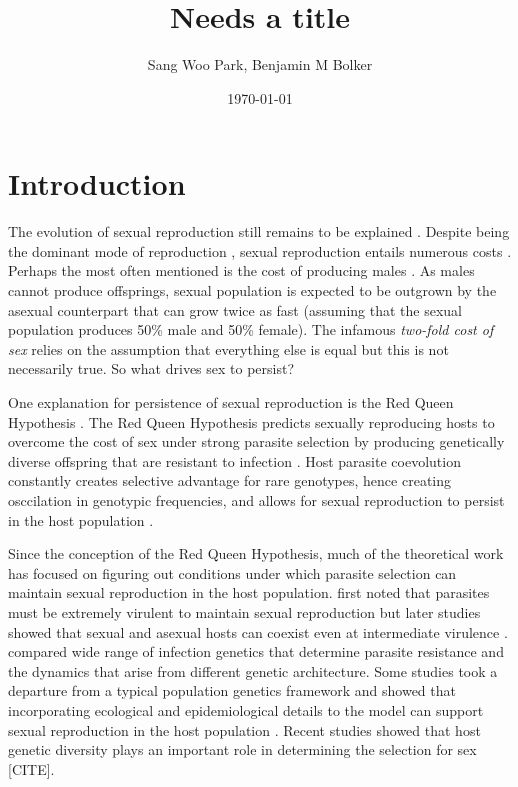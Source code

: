 \documentclass{article}\usepackage[]{graphicx}\usepackage[]{color}
\title{Needs a title}
\author{Sang Woo Park, Benjamin M Bolker}
\date{\today}
\begin{document}
\maketitle

\section{Introduction}

The evolution of sexual reproduction still remains to be explained \citep{otto2009evolutionary}.
Despite being the dominant mode of reproduction \citep{vrijenhoek1998animal}, sexual reproduction entails numerous costs \citep{lehtonen2012many}.
Perhaps the most often mentioned is the cost of producing males \citep{smith1978evolution}.
As males cannot produce offsprings, sexual population is expected to be outgrown by the asexual counterpart that can grow twice as fast (assuming that the sexual population produces 50\% male and 50\% female).
The infamous \emph{two-fold cost of sex} \citep{smith1978evolution} relies on the assumption that everything else is equal but this is not necessarily true.
So what drives sex to persist?

One explanation for persistence of sexual reproduction is the Red Queen Hypothesis \citep{bell1982masterpiece}.
The Red Queen Hypothesis predicts sexually reproducing hosts to overcome the cost of sex under strong parasite selection by producing genetically diverse offspring that are resistant to infection \citep{jbs1949disease, jaenike1978hypothesis, hamilton1980sex}.
Host parasite coevolution constantly creates selective advantage for rare genotypes, hence creating osccilation in genotypic frequencies, and allows for sexual reproduction to persist in the host population \citep{clarke1976ecological, hamilton1980sex}.

Since the conception of the Red Queen Hypothesis, much of the theoretical work has focused on figuring out conditions under which parasite selection can maintain sexual reproduction in the host population.
\cite{may1983epidemiology} first noted that parasites must be extremely virulent to maintain sexual reproduction but later studies showed that sexual and asexual hosts can coexist even at intermediate virulence \citep{howard1994parasitism}.
\cite{agrawal2002infection} compared wide range of infection genetics that determine parasite resistance and the dynamics that arise from different genetic architecture.
Some studies took a departure from a typical population genetics framework and showed that incorporating ecological and epidemiological details to the model can support sexual reproduction in the host population \citep{galvani2001antigenic, galvani2003maintenance, lively2009maintenance, lively2010epidemiological}.
Recent studies showed that host genetic diversity plays an important role in determining the selection for sex [CITE].
\end{document}
